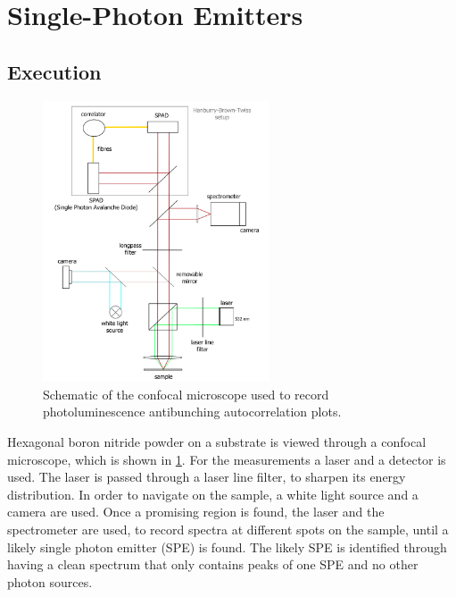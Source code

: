 \section{Single-Photon Emitters}
\label{sec:SPE}

\subsection{Execution} %

\begin{figure}[H]
    \centering
    \includegraphics[width=0.6\textwidth]{img/setup2.png}
    \caption{Schematic of the confocal microscope used to record photoluminescence antibunching autocorrelation plots.}
    \label{fig_confocal}
\end{figure}

Hexagonal boron nitride powder on a substrate is viewed through a confocal microscope, which is shown in \cref{fig_confocal}.
For the measurements a laser and a detector is used.
The laser is passed through a laser line filter, to sharpen its energy distribution.
In order to navigate on the sample, a white light source and a camera are used.
Once a promising region is found, the laser and the spectrometer are used, to record spectra at different spots on the sample, until a likely single photon emitter (SPE) is found.
The likely SPE is identified through having a clean spectrum that only contains peaks of one SPE and no other photon sources.

